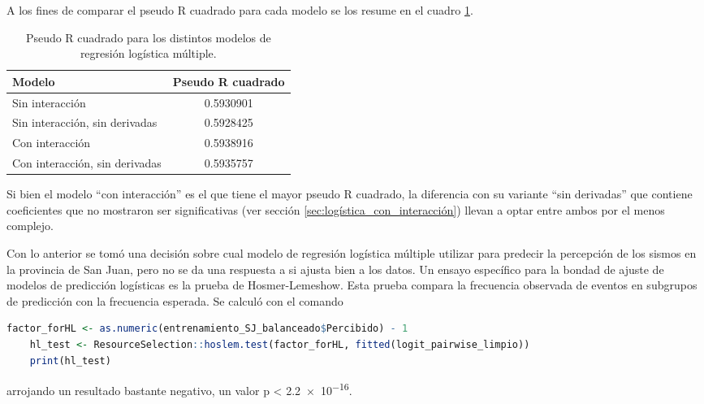 \documentclass[a4paper]{report}
\begin{document}
A los fines de comparar el pseudo R cuadrado para cada modelo se los resume en el cuadro \ref{tab:pseudo_r2}.
\begin{table}[!ht]
	\centering
	\begin{tabular}{lc}
		\toprule
		Modelo & Pseudo R cuadrado\\
		\midrule
		Sin interacción & \num{0.5930901}\\
		Sin interacción, sin derivadas & \num{0.5928425}\\
		Con interacción & \num{0.5938916}\\
		Con interacción, sin derivadas & \num{0.5935757}\\
		\bottomrule
	\end{tabular}
	\caption{Pseudo R cuadrado para los distintos modelos de regresión logística múltiple.}
	\label{tab:pseudo_r2}
\end{table}

Si bien el modelo ``con interacción'' es el que tiene el mayor pseudo R cuadrado, la diferencia con su variante ``sin derivadas'' que contiene coeficientes que no mostraron ser significativas (ver sección \ref{sec:logística_con_interacción}) llevan a optar entre ambos por el menos complejo.

Con lo anterior se tomó una decisión sobre cual modelo de regresión logística múltiple utilizar para predecir la percepción de los sismos en la provincia de San Juan, pero no se da una respuesta a si ajusta bien a los datos.
Un ensayo específico para la bondad de ajuste de modelos de predicción logísticas es la prueba de Hosmer-Lemeshow. 
Esta prueba compara la frecuencia observada de eventos en subgrupos de predicción con la frecuencia esperada.
Se calculó con el comando
\begin{lstlisting}[language=R, breaklines=true]
	factor_forHL <- as.numeric(entrenamiento_SJ_balanceado$Percibido) - 1
	hl_test <- ResourceSelection::hoslem.test(factor_forHL, fitted(logit_pairwise_limpio))
	print(hl_test)
\end{lstlisting}
arrojando un resultado bastante negativo, un valor p < \num{2.2e-16}.
\end{document}

